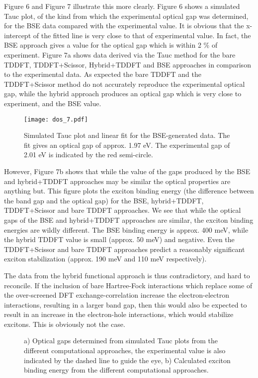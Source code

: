 \documentclass[prb,showpacs,superscriptaddress,titlepage,amsmath,amssymb,twocolumn]{revtex4-1}
\begin{document}
Figure 6 and Figure 7 illustrate this more clearly. Figure 6 shows a simulated Tauc plot, of the kind from which the experimental optical gap was determined, for the BSE data compared with the experimental value. It is obvious that the x-intercept of the fitted line is very close to that of experimental value. In fact, the BSE approach gives a value for the optical gap which is within 2 \% of experiment. Figure 7a shows data derived via the Tauc method for the bare TDDFT, TDDFT+Scissor, Hybrid+TDDFT and BSE approaches in comparison to the experimental data. As expected the bare TDDFT and the TDDFT+Scissor method do not accurately reproduce the experimental optical gap, while the hybrid approach produces an optical gap which is very close to experiment, and the BSE value.

\begin{figure}[!t]
    \centering
    \texttt{[image: dos\_7.pdf]}
    \caption{ Simulated Tauc plot and linear fit for the BSE-generated data. The fit gives an optical gap of approx. 1.97 eV. The experimental gap of 2.01 eV is indicated by the red semi-circle.}
    \label{fig:bs}
\end{figure}

 However, Figure 7b shows that while the value of the gaps produced by the BSE and hybrid+TDDFT approaches may be similar the optical properties are anything but. This figure plots the exciton binding energy (the difference between the band gap and the optical gap) for the BSE, hybrid+TDDFT, TDDFT+Scissor and bare TDDFT approaches. We see that while the optical gaps of the BSE and hybrid+TDDFT approaches are similar, the exciton binding energies are wildly different. The BSE binding energy is approx. 400 meV, while the hybrid TDDFT value is small (approx. 50 meV) and negative. Even the TDDFT+Scissor and bare TDDFT approaches predict a reasonably significant exciton stabilization (approx. 190 meV and 110 meV respectively).

The data from the hybrid functional approach is thus contradictory, and hard to reconcile. If the inclusion of bare Hartree-Fock interactions which replace some of the over-screened DFT exchange-correlation increase the electron-electron interactions, resulting in a larger band gap, then this would also be expected to result in an increase in the electron-hole interactions, which would stabilize excitons. This is obviously not the case.


\begin{figure}[!t]
    \centering
    \caption{ a) Optical gaps determined from simulated Tauc plots from the different computational approaches, the experimental value is also indicated by the dashed line to guide the eye, b) Calculated exciton binding energy from the different computational approaches.}
    \label{fig:bs}
\end{figure}
\end{document}
